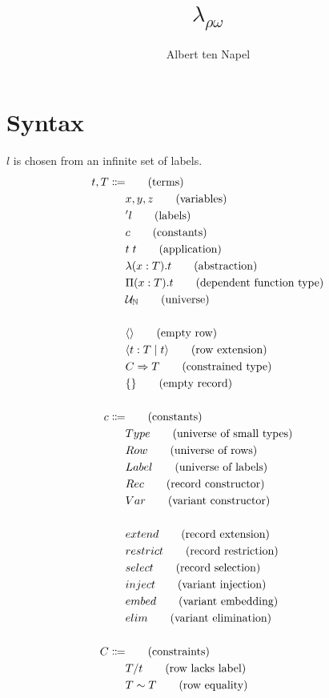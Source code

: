 \documentclass[12pt]{article}
\title{$\lambda_{\rho\omega}$}
\author{Albert ten Napel}
\date{}
\newcommand\tapp[2]{#1 \; #2} %
\newcommand\tabs[3]{\lambda(#1 : #2) . #3} %
\newcommand\tpi[3]{\Pi(#1 : #2) . #3} %
\newcommand\ttype[0]{\mathnormal{Type}} %
\newcommand\trow[0]{\mathnormal{Row}} %
\newcommand\tlabel[0]{\mathnormal{Label}} %
\newcommand\trecord[0]{\mathnormal{Rec}} %
\newcommand\tvariant[0]{\mathnormal{Var}} %
\newcommand\tuni[1]{\mathcal{U}_{#1}} %
\newcommand\tempty[0]{\langle\rangle} %
\newcommand\textend[3]{\langle #1 : #2 \; | \; #3\rangle} %
\newcommand\tconstrained[2]{#1 \Rightarrow #2} %
\newcommand\trecempty[0]{\{\}} %
\newcommand\trecextend[0]{\mathnormal{extend}} %
\newcommand\trecrestrict[0]{\mathnormal{restrict}} %
\newcommand\trecselect[0]{\mathnormal{select}} %
\newcommand\tvarinject[0]{\mathnormal{inject}} %
\newcommand\tvarembed[0]{\mathnormal{embed}} %
\newcommand\tvarelim[0]{\mathnormal{elim}} %
\newcommand\clacks[2]{#1 / #2} %
\newcommand\croweq[2]{#1 \sim #2} %
\begin{document}
\maketitle

\section{Syntax}
$l$ is chosen from an infinite set of labels.
\begin{align}
	t, T \Coloneqq	&							\tag{terms} \\
				& x, y, z						\tag{variables} \\
				& 'l 							\tag{labels} \\
				& c 							\tag{constants} \\
				& \tapp{t}{t}					\tag{application} \\
				& \tabs{x}{T}{t}					\tag{abstraction} \\
				& \tpi{x}{T}{t}					\tag{dependent function type} \\
				& \tuni{\mathbb{N}}				\tag{universe} \\
				& \nonumber \\
				& \tempty						\tag{empty row} \\
				& \textend{t}{T}{t}				\tag{row extension} \\
				& \tconstrained{C}{T}				\tag{constrained type} \\
				& \trecempty						\tag{empty record} \\
				& \nonumber \\				
	c \Coloneqq		&							\tag{constants} \\
				& \ttype						\tag{universe of small types} \\
				& \trow						\tag{universe of rows} \\
				& \tlabel						\tag{universe of labels} \\
				& \trecord						\tag{record constructor} \\
				& \tvariant						\tag{variant constructor} \\
				& \nonumber\\
				& \trecextend					\tag{record extension} \\
				& \trecrestrict					\tag{record restriction} \\
				& \trecselect						\tag{record selection} \\
				& \tvarinject						\tag{variant injection} \\
				& \tvarembed					\tag{variant embedding} \\
				& \tvarelim						\tag{variant elimination} \\
				& \nonumber \\
	C \Coloneqq		&							\tag{constraints} \\
				& \clacks{T}{t}					\tag{row lacks label} \\
				& \croweq{T}{T}					\tag{row equality} \\
\end{align}
\end{document}
